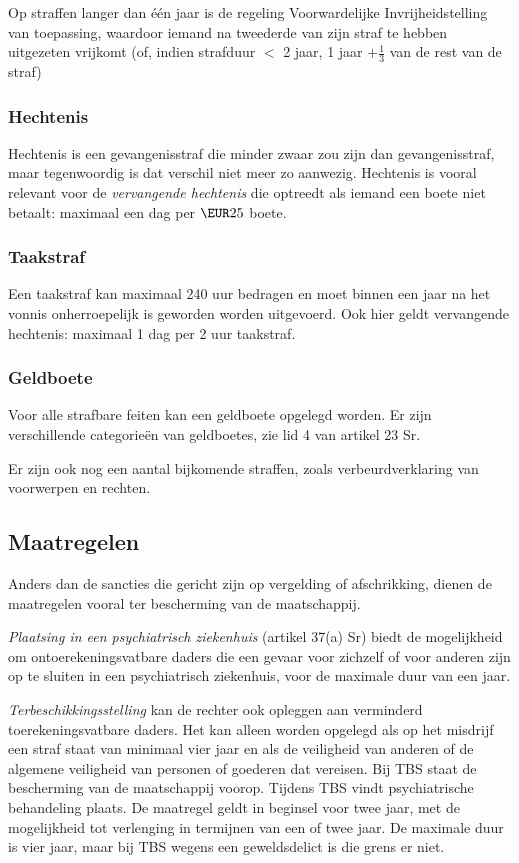 \documentclass{article}
\begin{document}
Op straffen langer dan \'e\'en jaar is de regeling Voorwardelijke
Invrijheidstelling van toepassing, waardoor iemand na tweederde van zijn straf
te hebben uitgezeten vrijkomt (of, indien strafduur $<$ 2 jaar, 1 jaar
$+\frac{1}{3}$ van de rest van de straf)

\subsubsection{Hechtenis}

Hechtenis is een gevangenisstraf die minder zwaar zou zijn dan gevangenisstraf,
maar tegenwoordig is dat verschil niet meer zo aanwezig. Hechtenis is vooral
relevant voor de \emph{vervangende hechtenis} die optreedt als iemand een boete
niet betaalt: maximaal een dag per $\EUR 25$ boete.

\subsubsection{Taakstraf}

Een taakstraf kan maximaal 240 uur bedragen en moet binnen een jaar na het vonnis
onherroepelijk is geworden worden uitgevoerd. Ook hier geldt vervangende hechtenis:
maximaal 1 dag per 2 uur taakstraf.

\subsubsection{Geldboete}

Voor alle strafbare feiten kan een geldboete opgelegd worden. Er zijn verschillende
categorie\"en van geldboetes, zie lid 4 van artikel 23 Sr.

Er zijn ook nog een aantal bijkomende straffen, zoals verbeurdverklaring van voorwerpen
en rechten.

\subsection{Maatregelen}

Anders dan de sancties die gericht zijn op vergelding of afschrikking, dienen
de maatregelen vooral ter bescherming van de maatschappij.

\emph{Plaatsing in een psychiatrisch ziekenhuis} (artikel 37(a) Sr) biedt de
mogelijkheid om ontoerekeningsvatbare daders die een gevaar voor zichzelf of
voor anderen zijn op te sluiten in een psychiatrisch ziekenhuis, voor de
maximale duur van een jaar.

\emph{Terbeschikkingsstelling} kan de rechter ook opleggen aan verminderd
toerekeningsvatbare daders. Het kan alleen worden opgelegd als op het misdrijf
een straf staat van minimaal vier jaar en als de veiligheid van anderen of de
algemene veiligheid van personen of goederen dat vereisen. Bij TBS staat de
bescherming van de maatschappij voorop. Tijdens TBS vindt psychiatrische
behandeling plaats. De maatregel geldt in beginsel voor twee jaar, met de
mogelijkheid tot verlenging in termijnen van een of twee jaar. De maximale duur
is vier jaar, maar bij TBS wegens een geweldsdelict is die grens er niet.
\end{document}
